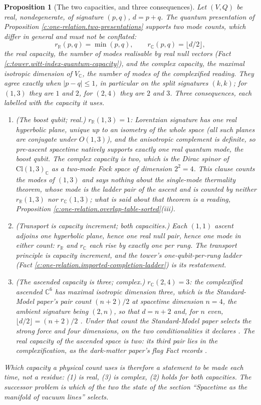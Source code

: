 \documentclass[11pt]{article}
\newtheorem{proposition}[theorem]{Proposition}
\theoremstyle{definition}
\theoremstyle{plain}
\newcommand{\changedmark}[2]{\marginpar{\raggedright\scriptsize\color{#1}#2}}
\providecommand{\C}{}\renewcommand{\C}{\mathbb{C}}
\providecommand{\Cl}{}\renewcommand{\Cl}{\mathrm{Cl}}
\providecommand{\R}{}\renewcommand{\R}{\mathbb{R}}
\begin{document}
\begin{proposition}[The two capacities, and three consequences]\label{c:one-relation.two-capacities-three-consequences}
\changedmark{gray}{reworded}
Let $(V,Q)$ be real, nondegenerate, of signature $(p,q)$, $d = p+q$. The quantum presentation of Proposition \ref{c:one-relation.two-presentations} supports two mode counts, which differ in general and must not be conflated:
\[
r_{\R}(p,q) = \min(p,q), \qquad r_{\C}(p,q) = \lfloor d/2 \rfloor,
\]
the \emph{real capacity}, the number of modes realisable by real null vectors (Fact \ref{c:tower.witt-index-quantum-capacity}), and the \emph{complex capacity}, the maximal isotropic dimension of $V_{\C}$, the number of modes of the complexified reading. They agree exactly when $|p - q| \leq 1$, in particular on the split signatures $(k,k)$; for $(1,3)$ they are $1$ and $2$, for $(2,4)$ they are $2$ and $3$. Three consequences, each labelled with the capacity it uses.
\begin{enumerate}
\item \emph{(The boost qubit; real.)} $r_{\R}(1,3) = 1$: Lorentzian signature has one real hyperbolic plane, unique up to an isometry of the whole space (all such planes are conjugate under $O(1,3)$), and the anisotropic complement is definite, so pre-ascent spacetime natively supports exactly one \emph{real} quantum mode, the boost qubit. The complex capacity is two, which is the Dirac spinor of $\Cl(1,3)_{\C}$ as a two-mode Fock space of dimension $2^{2} = 4$. This clause counts the modes of $(1,3)$ and says nothing about the single-mode thermality theorem, whose mode is the ladder pair of the ascent and is counted by neither $r_{\R}(1,3)$ nor $r_{\C}(1,3)$; what is said about that theorem is a reading, Proposition \ref{c:one-relation.overlap-table-sorted}(iii).
\item \emph{(Transport is capacity increment; both capacities.)} Each $(1,1)$ ascent adjoins one hyperbolic plane, hence one real null pair, hence one mode in either count: $r_{\R}$ and $r_{\C}$ each rise by exactly one per rung. The transport principle is capacity increment, and the tower's one-qubit-per-rung ladder (Fact \ref{c:one-relation.imported-completion-ladder}) is its restatement.
\item \emph{(The ascended capacity is three; complex.)} $r_{\C}(2,4) = 3$: the complexified ascended $\C^{6}$ has maximal isotropic dimension three, which is the Standard-Model paper's pair count $(n+2)/2$ at spacetime dimension $n = 4$, the ambient signature being $(2,n)$, so that $d = n + 2$ and, for $n$ even, $\lfloor d/2 \rfloor = (n+2)/2$ \cite[Lem.~2.12]{ButlerT12}. Under that count the Standard-Model paper selects the strong force and four dimensions, on the two conditionalities it declares \cite[Prop.~4.3]{ButlerT12}. The real capacity of the ascended space is two: its third pair lies in the complexification, as the dark-matter paper's flag Fact records \cite[Fact~2.9]{ButlerT14}.
\end{enumerate}
Which capacity a physical count uses is therefore a statement to be made each time, not a residue: (1) is real, (3) is complex, (2) holds for both capacities. The successor problem is which of the two the state of the section ``Spacetime as the manifold of vacuum lines'' selects.
\end{proposition}
\end{document}
